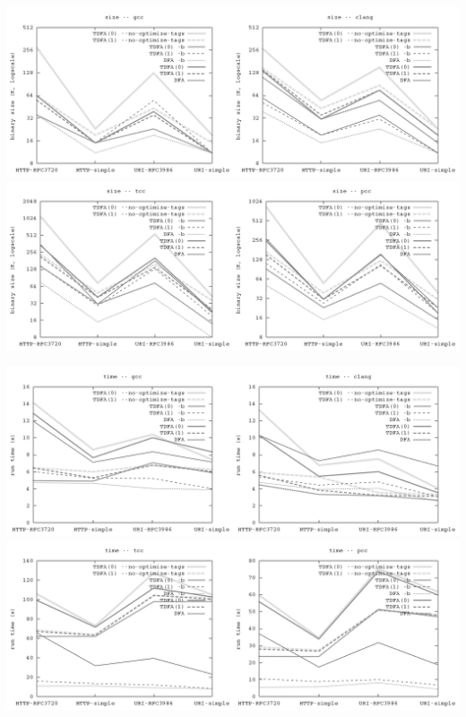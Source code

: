 \documentclass{article}
\newenvironment{Xfig}
    {\par\medskip\noindent\minipage{\linewidth}\begin{center}}
    {\end{center}\endminipage\par\medskip}
\theoremstyle{definition}
\begin{document}
\begin{Xfig}
\includegraphics[width=\linewidth]{img/bench_size_gcc_clang.png}
\includegraphics[width=\linewidth]{img/bench_size_tcc_pcc.png}
\end{Xfig}

\begin{Xfig}
\includegraphics[width=\linewidth]{img/bench_time_gcc_clang.png}
\includegraphics[width=\linewidth]{img/bench_time_tcc_pcc.png}
\end{Xfig}
\end{document}
